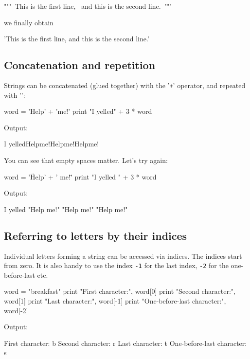 \begin{bluecode}
"""\
This is the first line, \
and this is the second line.\
""" 
\end{bluecode}
we finally obtain 

\begin{bluecode}
'This is the first line, and this is the second line.'
\end{bluecode}


\subsection{Concatenation and repetition}

Strings can be concatenated (glued together) with the '{\tt +}' operator, and repeated with '{\tt *}':

\begin{bluecode}
word = 'Help' + 'me!'
print "I yelled" + 3 * word
\end{bluecode}
Output:

\begin{bluecode}
I yelledHelpme!Helpme!Helpme!
\end{bluecode}
You can see that empty spaces matter. Let's try again:

\begin{bluecode}
word = '\"Help' + ' me!\" '
print "I yelled " + 3 * word
\end{bluecode}
Output:

\begin{bluecode}
I yelled "Help me!" "Help me!" "Help me!"
\end{bluecode}

\subsection{Referring to letters by their indices}\label{subsec:ind}

Individual letters forming a string can be accessed via indices. The indices 
start from zero. It is also handy to use the index {\tt -1} 
for the last index, {\tt -2} for the one-before-last etc.

\begin{bluecode}
word = "breakfast"
print "First character:", word[0]
print "Second character:", word[1]
print "Last character:", word[-1]
print "One-before-last character:", word[-2]
\end{bluecode}
Output:

\begin{bluecode}
First character: b
Second character: r
Last character: t
One-before-last character: s
\end{bluecode}

